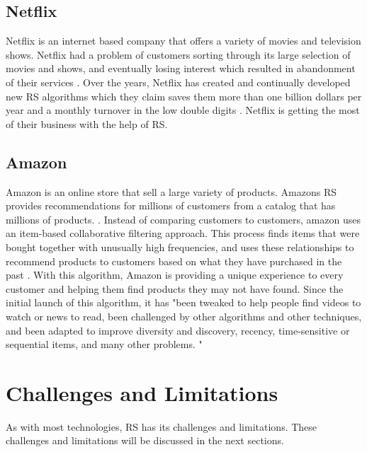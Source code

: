 \documentclass[sigconf]{acmart}
\begin{document}
\subsection{Netflix}
Netflix is an internet based company that offers a variety of movies and television shows. Netflix had a problem of customers sorting through its large selection of movies and shows, and eventually losing interest which resulted in abandonment of their services \cite{Gomez-Uribe2015}. Over the years, Netflix has created and continually developed new RS algorithms which they claim saves them more than one billion dollars per year and a monthly turnover in the low double digits \cite{Gomez-Uribe2015}. Netflix is getting the most of their business with the help of RS.
\subsection{Amazon}
Amazon is an online store that sell a large variety of products. Amazons RS provides recommendations for millions of customers from a catalog that has millions of products. \cite{Smith2017}. Instead of comparing customers to customers, amazon uses an item-based collaborative filtering approach. This process finds items that were bought together with unusually high frequencies, and uses these relationships to recommend products to customers based on what they have purchased in the past \cite{Smith2017}. With this algorithm, Amazon is providing a unique experience to every customer and helping them find products they may not have found. Since the initial launch of this algorithm, it has "been tweaked to help people find videos to watch or news to read, been challenged by other algorithms and other techniques, and been adapted to improve diversity and discovery, recency, time-sensitive or sequential items, and many other problems. " \cite{Smith2017mith2017}

\section{Challenges and Limitations}
As with most technologies, RS has its challenges and limitations. These challenges and limitations will be discussed in the next sections.
\end{document}
